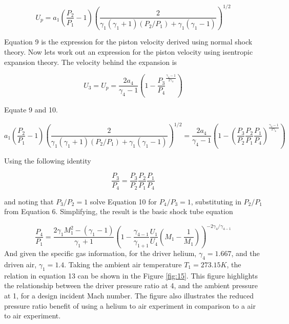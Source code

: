 \begin{equation}
U_p = a_1\left(\frac{P_2}{P_1} - 1\right)\left(\frac{2}{\gamma_1(\gamma_1 + 1)(P_2/P_1) + \gamma_1(\gamma_1 - 1)}\right)^{1/2}
\end{equation}

Equation 9 is the expression for the piston velocity derived using normal shock theory. Now lets work out an expression for the piston velocity using isentropic expansion theory. The velocity behind the expansion is

\begin{equation}
U_3 = U_p = \frac{2a_4}{\gamma_4 - 1}\left(1 - \frac{P_3}{P_4}^{\frac{\gamma_4 - 1}{2\gamma_4}}\right)
\end{equation}

Equate 9 and 10.

\begin{equation}
a_1\left(\frac{P_2}{P_1} - 1\right)\left(\frac{2}{\gamma_1(\gamma_1 + 1)(P_2/P_1) + \gamma_1(\gamma_1 - 1)}\right)^{1/2} = \frac{2a_4}{\gamma_4 - 1}\left(1 - \left(\frac{P_3}{P_2}\frac{P_2}{P_1}\frac{P_1}{P_4}\right)^{\frac{\gamma_4 - 1}{2\gamma_4}}\right)
\end{equation}

Using the following identity

\begin{equation}
\frac{P_3}{P_4}=\frac{P_3}{P_2}\frac{P_2}{P_1}\frac{P_1}{P_4}
\end{equation}

and noting that $P_3/P_2 = 1$ solve Equation 10 for $P_4/P_3 = 1$, substituting in $P_2/P_1$ from Equation 6. Simplifying, the result is the basic shock tube equation

\begin{equation}
\frac{P_4}{P_1} = \frac{2\gamma_1M_1^2 - (\gamma_1 - 1)}{\gamma_1 + 1}\left(1 - \frac{\gamma_{4-1}}{\gamma_{1+1}}\frac{U_1}{U_4}\left(M_1 - \frac{1}{M_1}\right)\right)^{-2\gamma_4/\gamma_{4-1}}
\end{equation}
And given the specific gas information, for the driver helium, $\gamma_4 = 1.667$, and the driven air, $\gamma_1 = 1.4$. Taking the ambient air temperature $T_1 = 273.15K$, the relation in equation 13 can be shown in the Figure \ref{fig:15}. This figure highlights the relationship between the driver pressure ratio at 4, and the ambient pressure at 1, for a design incident Mach number. The figure also illustrates the reduced pressure ratio benefit of using a helium to air experiment in comparison to a air to air experiment. 
	
